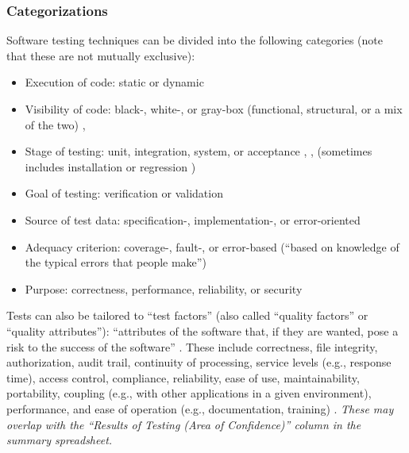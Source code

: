 \begin{landscape}
      \otherTestTermsTable{}
\end{landscape}
\restoregeometry

\subsubsection{Categorizations}
\label{testing-categories}

Software testing techniques can be divided into the following
categories (note that these are not mutually exclusive):

\begin{itemize}
      \item Execution of code: static or dynamic
            \citep[p.~53]{Patton2006}
      \item Visibility of code: black-, white-, or gray-box (functional,
            structural, or a mix of the two)
            \citep[pp.~53, 218]{Patton2006}, \citep[p.~69]{Perry2006}
      \item Stage of testing: unit, integration, system, or acceptance
            \citep{Patton2006}, \citep{Perry2006},
            \citep{PetersAndPedrycz2000} (sometimes includes installation
            \citep[p.~439]{vanVliet2000} or regression
            \citep[p.~3]{BarbosaEtAl2006})
      \item Goal of testing: verification or validation
            \citep[pp.~69-70]{Perry2006}
      \item Source of test data: specification-, implementation-, or
            error-oriented \citep[p.~440]{PetersAndPedrycz2000}
      \item Adequacy criterion: coverage-, fault-, or error-based
            (``based on knowledge of the typical errors that people make'')
            \citep[pp.~398-399]{vanVliet2000}
      \item Purpose: correctness, performance, reliability, or security
            \citep{Pan1999}
\end{itemize}

Tests can also be tailored to ``test factors'' (also called ``quality factors''
or ``quality attributes''): ``attributes of the software that, if they are
wanted, pose a risk to the success of the software''
\citep[p.~40]{Perry2006}. These include correctness, file integrity,
authorization, audit trail, continuity of processing, service levels
(e.g., response time), access control, compliance, reliability, ease of use,
maintainability, portability, coupling (e.g., with other applications in a
given environment), performance, and ease of operation (e.g., documentation,
training) \citep[pp.~40-41]{Perry2006}. \emph{These may overlap with
      the ``Results of Testing (Area of Confidence)'' column in the summary
      spreadsheet.}

